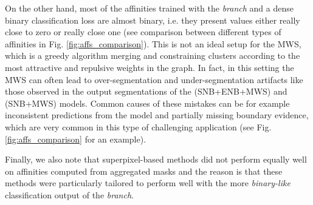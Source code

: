 On the other hand, most of the affinities trained with the \emph{\sparseBr} \linebreak \emph{branch} and a dense binary classification loss are almost binary, i.e. they present values either really close to zero or really close one (see comparison between different types of affinities in Fig. \ref{fig:affs_comparison}).
This is not an ideal setup for the MWS, which is a greedy algorithm merging and constraining clusters according to the most attractive and repulsive weights in the graph.
In fact, in this setting the MWS can often lead to over-segmentation and under-segmentation artifacts like those observed in the output segmentations of the (SNB+ENB+MWS) and (SNB+MWS) models. Common causes of these mistakes can be for example inconsistent predictions from the model and partially missing boundary evidence, which are very common in this type of challenging application (see Fig. \ref{fig:affs_comparison} for an example). 

Finally, we also note that superpixel-based methods did not perform equally well on affinities computed from aggregated masks and the reason is that these methods were particularly tailored to perform well with the more \emph{binary-like} classification output of the \emph{\sparseBr branch}.



